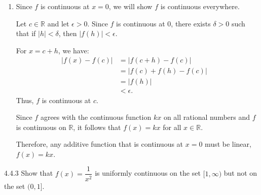 {\begin{enumerate}
        Now, observe that for \(p,q \in \Z\) with \(q \ne 0\), we have:
        \[
            f\left(\underbrace{\dfrac{p}{q} + \dfrac{p}{q} + \cdots + \dfrac{p}{q}}_{q\text{ times}}\right) = f(p).
        \]
        Similarly, by the additive condition (\(q\) times on each side): 
        \[
            f\left(\dfrac{p}{q} + \dfrac{p}{q} + \cdots + \dfrac{p}{q}\right) = f\left(\dfrac{p}{q}\right) + f\left(\dfrac{p}{q}\right) + \cdots + f\left(\dfrac{p}{q}\right).
        \]
        This is equivalent to:
        \[
            q \cdot f\left(\dfrac{p}{q}\right) = f(p).
        \]
        Therefore, 
        \[
            f\left(\dfrac{p}{q}\right) = \dfrac{1}{q} f(p) 
        \]
        Putting everything together, we let \(r = \dfrac{p}{q}\). Then,
        \begin{align*}
            f\left( \dfrac{p}{q} \right) &= \dfrac{1}{q} f(p) \\
            &= \dfrac{1}{q} (kp) \quad (\text{from (1)})\\
            &= k \left( \dfrac{p}{q} \right) \\
            &= kr.
        \end{align*}
        Thus, \(f(r) = kr\) for any rational number \(r\).
        \item Since \(f\) is continuous at \(x = 0\), we will show \(f\) is continuous everywhere.

        Let \(c \in \mathbb{R}\) and let \(\epsilon > 0\). Since \(f\) is continuous at \(0\), there exists \(\delta > 0\) such that if \(|h| < \delta\), then \(|f(h)| < \epsilon\).

        For \(x = c + h\), we have:
        \begin{align*}
            |f(x) - f(c)| &= |f(c + h) - f(c)| \\
            &= |f(c) + f(h) - f(c)| \quad \\
            &= |f(h)| \\
            &< \epsilon.
        \end{align*}
        Thus, \(f\) is continuous at \(c\).

        Since \(f\) agrees with the continuous function \(kx\) on all rational numbers and \(f\) is continuous on \(\mathbb{R}\), it follows that \(f(x) = kx\) for all \(x \in \mathbb{R}\).

        Therefore, any additive function that is continuous at \(x = 0\) must be linear, \(f(x) = kx\).
    \end{enumerate}
}
\newpage
\begin{exercise}
    {4.4.3} Show that \(f(x) = \dfrac{1}{x^2}\) is uniformly continuous on the set \([1, \infty)\) but not on the set \((0, 1]\).
\end{exercise}

